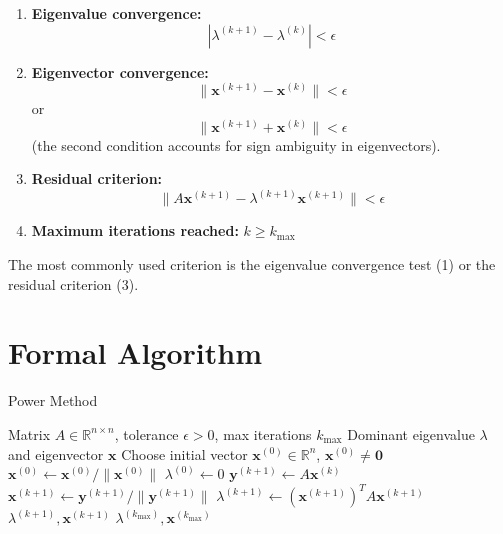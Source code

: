 \documentclass[11pt, a4paper]{article}
\begin{document}
\begin{enumerate}
    \item \textbf{Eigenvalue convergence:}
    \begin{equation}
        |\lambda^{(k+1)} - \lambda^{(k)}| < \epsilon
    \end{equation}
    
    \item \textbf{Eigenvector convergence:}
    \begin{equation}
        \|\mathbf{x}^{(k+1)} - \mathbf{x}^{(k)}\| < \epsilon
    \end{equation}
    or
    \begin{equation}
        \|\mathbf{x}^{(k+1)} + \mathbf{x}^{(k)}\| < \epsilon
    \end{equation}
    (the second condition accounts for sign ambiguity in eigenvectors).
    
    \item \textbf{Residual criterion:}
    \begin{equation}
        \|A\mathbf{x}^{(k+1)} - \lambda^{(k+1)}\mathbf{x}^{(k+1)}\| < \epsilon
    \end{equation}
    
    \item \textbf{Maximum iterations reached:} $k \geq k_{\max}$
\end{enumerate}

The most commonly used criterion is the eigenvalue convergence test (1) or the residual criterion (3).

\section{Formal Algorithm}

\begin{algorithm}
\caption{Power Method}
\begin{algorithmic}[1]
\Require Matrix $A \in \mathbb{R}^{n \times n}$, tolerance $\epsilon > 0$, max iterations $k_{\max}$
\Ensure Dominant eigenvalue $\lambda$ and eigenvector $\mathbf{x}$
\State Choose initial vector $\mathbf{x}^{(0)} \in \mathbb{R}^n$, $\mathbf{x}^{(0)} \neq \mathbf{0}$
\State $\mathbf{x}^{(0)} \leftarrow \mathbf{x}^{(0)} / \|\mathbf{x}^{(0)}\|$
\State $\lambda^{(0)} \leftarrow 0$
    \State $\mathbf{y}^{(k+1)} \leftarrow A\mathbf{x}^{(k)}$
    \State $\mathbf{x}^{(k+1)} \leftarrow \mathbf{y}^{(k+1)} / \|\mathbf{y}^{(k+1)}\|$
    \State $\lambda^{(k+1)} \leftarrow (\mathbf{x}^{(k+1)})^T A \mathbf{x}^{(k+1)}$
        \State \Return $\lambda^{(k+1)}, \mathbf{x}^{(k+1)}$
    \EndIf
\EndFor
\State \Return $\lambda^{(k_{\max})}, \mathbf{x}^{(k_{\max})}$ 
\end{algorithmic}
\end{algorithm}
\end{document}
